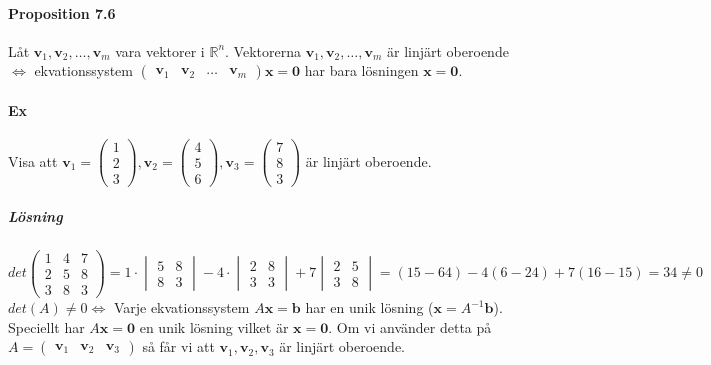 \paragraph{Proposition 7.6} Låt $\bm{v}_{1},\bm{v}_{2},\ldots,\bm{v}_{m}$ vara vektorer i $\mathbb{R}^{n}$.
Vektorerna $\bm{v}_{1},\bm{v}_{2},\ldots,\bm{v}_{m}$ är linjärt oberoende $\Leftrightarrow$ ekvationssystem $\begin{pmatrix}\bm{v}_{1}&\bm{v}_{2}&\ldots&\bm{v}_{m}\end{pmatrix}\bm{x}=\bm{0}$ har bara lösningen $\bm{x}=\bm{0}$.

\paragraph{Ex} Visa att $\bm{v}_{1}=\begin{pmatrix}1\\2\\3\end{pmatrix}, \bm{v}_{2}=\begin{pmatrix}4\\5\\6\end{pmatrix}, \bm{v}_{3}=\begin{pmatrix}7\\8\\3\end{pmatrix}$ är linjärt oberoende.
\subparagraph{Lösning} 
\begin{equation*}
    det\begin{pmatrix}
        1&4&7\\
        2&5&8\\
        3&8&3
    \end{pmatrix}
    =
    1\cdot\begin{vmatrix}5&8\\8&3\end{vmatrix}
    -4\cdot\begin{vmatrix}2&8\\3&3\end{vmatrix}
    +7\begin{vmatrix}2&5\\3&8\end{vmatrix}
    =(15-64)-4(6-24)+7(16-15)=34\neq 0
\end{equation*}
$det(A)\neq 0 \Leftrightarrow$ Varje ekvationssystem $A\bm{x}=\bm{b}$ har en unik lösning ($\bm{x}=A^{-1}\bm{b}$).
Speciellt har $A\bm{x}=\bm{0}$ en unik lösning vilket är $\bm{x}=\bm{0}$.
Om vi använder detta på $A=\begin{pmatrix}
    \bm{v}_{1}&\bm{v}_{2}&\bm{v}_{3}
\end{pmatrix}$
så får vi att $\bm{v}_{1},\bm{v}_{2},\bm{v}_{3}$ är linjärt oberoende.

